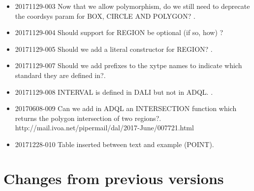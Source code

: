 \documentclass[11pt,a4paper]{ivoa}
\begin{document}
\begin{itemize}

    \item 20171129-003 Now that we allow polymorphism, do we still need to deprecate
    the coordsys param for BOX, CIRCLE AND POLYGON? .

    \item 20171129-004 Should support for REGION be optional (if so, how) ? 
    \item 20171129-005 Should we add a literal constructor for REGION? .

    \item 20171129-007 Should we add prefixes to the xytpe names to indicate
    which standard they are defined in?.

    \item 20171129-008 INTERVAL is defined in DALI but not in ADQL. .

    \item 20170608-009 Can we add in ADQL an INTERSECTION function
    which returns the polygon intersection of two regions?.
    http://mail.ivoa.net/pipermail/dal/2017-June/007721.html

    \item 20171228-010 Table inserted between text and example (POINT).


\end{itemize}

\newpage
\section{Changes from previous versions}
\label{sec:changes}
\end{document}
